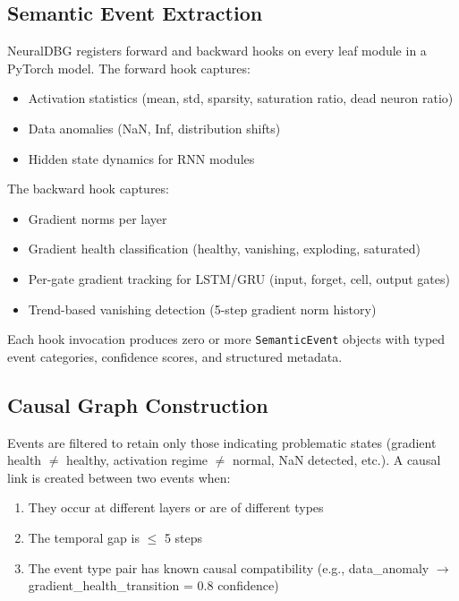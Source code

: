 \documentclass[11pt]{article}
\begin{document}
\subsection{Semantic Event Extraction}

NeuralDBG registers forward and backward hooks on every leaf module in a PyTorch model. The forward hook captures:
\begin{itemize}
    \item Activation statistics (mean, std, sparsity, saturation ratio, dead neuron ratio)
    \item Data anomalies (NaN, Inf, distribution shifts)
    \item Hidden state dynamics for RNN modules
\end{itemize}

The backward hook captures:
\begin{itemize}
    \item Gradient norms per layer
    \item Gradient health classification (healthy, vanishing, exploding, saturated)
    \item Per-gate gradient tracking for LSTM/GRU (input, forget, cell, output gates)
    \item Trend-based vanishing detection (5-step gradient norm history)
\end{itemize}

Each hook invocation produces zero or more \texttt{SemanticEvent} objects with typed event categories, confidence scores, and structured metadata.

\subsection{Causal Graph Construction}

Events are filtered to retain only those indicating problematic states (gradient health $\neq$ healthy, activation regime $\neq$ normal, NaN detected, etc.). A causal link is created between two events when:
\begin{enumerate}
    \item They occur at different layers or are of different types
    \item The temporal gap is $\leq$ 5 steps
    \item The event type pair has known causal compatibility (e.g., data\_anomaly $\rightarrow$ gradient\_health\_transition = 0.8 confidence)
\end{enumerate}
\end{document}
